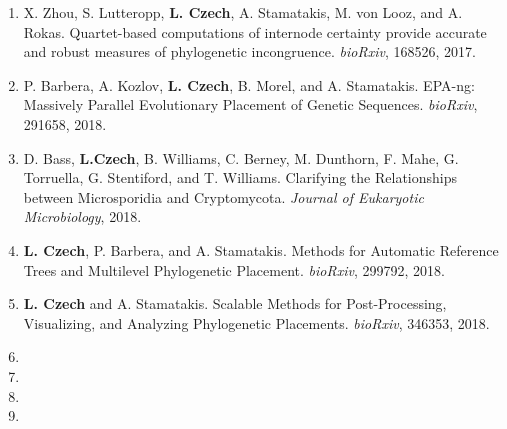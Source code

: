 \begin{enumerate}
    \item X. Zhou, S. Lutteropp, \textbf{L. Czech}, A. Stamatakis, M. von Looz, and A. Rokas.
        Quartet-based computations of internode certainty provide accurate and robust measures of phylogenetic incongruence.
        \textit{bioRxiv}, 168526, 2017. \cite{Zhou2017}

    \item P. Barbera, A. Kozlov, \textbf{L. Czech}, B. Morel, and A. Stamatakis.
        EPA-ng: Massively Parallel Evolutionary Placement of Genetic Sequences.
        \textit{bioRxiv}, 291658, 2018. \cite{Barbera2018}

    \item D. Bass, \textbf{L.Czech}, B. Williams, C. Berney, M. Dunthorn, F. Mahe, G. Torruella, G. Stentiford, and T. Williams.
        Clarifying the Relationships between Microsporidia and Cryptomycota.
        \textit{Journal of Eukaryotic Microbiology}, 2018.~\cite{Bass2018a}

    \item \textbf{L. Czech}, P. Barbera, and A. Stamatakis.
        Methods for Automatic Reference Trees and Multilevel Phylogenetic Placement.
        \textit{bioRxiv}, 299792, 2018. \cite{Czech2018}

    \item \textbf{L. Czech} and A. Stamatakis.
        Scalable Methods for Post-Processing, Visualizing, and Analyzing Phylogenetic Placements.
        \textit{bioRxiv}, 346353, 2018. \cite{Czech2018a}

    \item {}
    \item {}
    \item {}
    \item {}
\end{enumerate}

\clearpage

